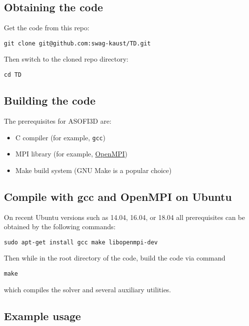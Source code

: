 \subsection{Obtaining the code}\label{obtaining-the-code}

Get the code from this repo:

\begin{verbatim}
git clone git@github.com:swag-kaust/TD.git
\end{verbatim}

Then switch to the cloned repo directory:

\begin{verbatim}
cd TD
\end{verbatim}

\subsection{Building the code}\label{building-the-code}

The prerequisites for ASOFI3D are:

\begin{itemize}
\tightlist
\item
  C compiler (for example, \texttt{gcc})
\item
  MPI library (for example, \href{https://www.open-mpi.org/}{OpenMPI})
\item
  Make build system (GNU Make is a popular choice)
\end{itemize}

\subsection{Compile with gcc and OpenMPI on
Ubuntu}\label{compile-with-gcc-and-openmpi-on-ubuntu}

On recent Ubuntu versions such as 14.04, 16.04, or 18.04 all
prerequisites can be obtained by the following commands:

\begin{verbatim}
sudo apt-get install gcc make libopenmpi-dev
\end{verbatim}

Then while in the root directory of the code, build the code via command

\begin{verbatim}
make
\end{verbatim}

which compiles the solver and several auxiliary utilities.

\subsection{Example usage}\label{example-usage}

